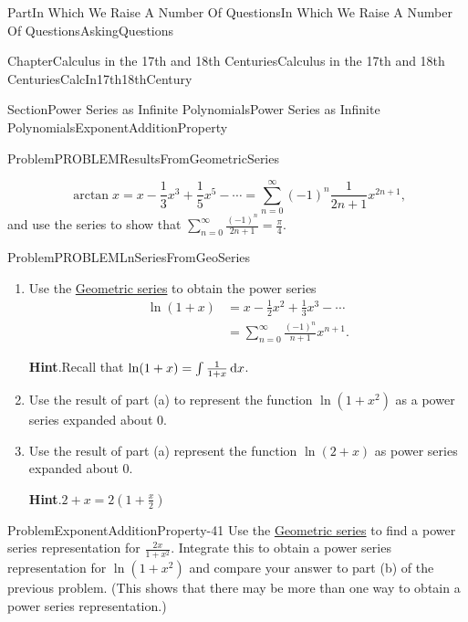 \documentclass[oneside,10pt,]{book}
\newcommand{\blocktitlefont}{\relax}
\numberwithin{equation}{part}
\newcommand{\dx}[1]{\,{\rm d}#1}
\newcommand{\amp}{&}
\begin{document}
\begin{partptx}{Part}{In Which We Raise A Number Of Questions}{}{In Which We Raise A Number Of Questions}{}{}{AskingQuestions}
\begin{chapterptx}{Chapter}{Calculus in the 17th and 18th Centuries}{}{Calculus in the 17th and 18th Centuries}{}{}{CalcIn17th18thCentury}
\begin{sectionptx}{Section}{Power Series as Infinite Polynomials}{}{Power Series as Infinite Polynomials}{}{}{ExponentAdditionProperty}
\begin{problem}{Problem}{}{PROBLEMResultsFromGeometricSeries}
\begin{enumerate}[font=\bfseries,label=(\alph*),ref=\alph*]
\begin{equation*}
\arctan
x=x-\frac{1}{3}x^3+\frac{1}{5}x^5-\cdots
=\sum_{n=0}^\infty(-1)^n
\frac{1}{2n+1}x^{2n+1}\text{,}
\end{equation*}
and use the series to show that \(\sum_{n=0}^\infty\frac{(-1)^n}{2n+1} = \frac{\pi}{4} \).%
\end{enumerate}%
\end{problem}
\begin{problem}{Problem}{}{PROBLEMLnSeriesFromGeoSeries}%
\begin{enumerate}[font=\bfseries,label=(\alph*),ref=\alph*]%
\item{}Use the \hyperref[EQUATIONGeometricSeries]{Geometric series} to obtain the power series%
\begin{align*}
\ln \left(1+x\right)\amp =x-\frac{1}{2}x^2+\frac{1}{3}x^3-\cdots\\
\amp =\sum_{n=0}^\infty\frac{(-1)^n}{n+1}x^{n+1}.{}
\end{align*}
%
\par\smallskip%
\noindent\textbf{\blocktitlefont Hint}.\hypertarget{PROBLEMLnSeriesFromGeoSeries-3-2}{}\quad{}Recall that \(\ln(1+x) = \int \frac{1}{1+x}\dx{x}\).%
\item{}Use the result of part (a) to represent the function \(\ln
\left(1+x^2\right)\) as a power series expanded about \(0\).%
\item{}Use the result of part (a) represent the function \(\ln
\left(2+x\right)\) as power series expanded about \(0\).%
\par\smallskip%
\noindent\textbf{\blocktitlefont Hint}.\hypertarget{PROBLEMLnSeriesFromGeoSeries-5-2}{}\quad{}\(2+x=2\left(1+\frac{x}{2}\right)\)%
\end{enumerate}%
\end{problem}
\begin{problem}{Problem}{}{ExponentAdditionProperty-41}%
Use the \hyperref[EQUATIONGeometricSeries]{Geometric series} to find a power series representation for \(\frac{2x}{1+x^2}\).  Integrate this to obtain a power series representation for \(\ln\left(1+x^2\right)\) and compare your answer to part (b) of the previous problem. (This shows that there may be more than one way to obtain a power series representation.)%
\end{problem}

\end{sectionptx}
\end{chapterptx}
\end{partptx}
\end{document}
